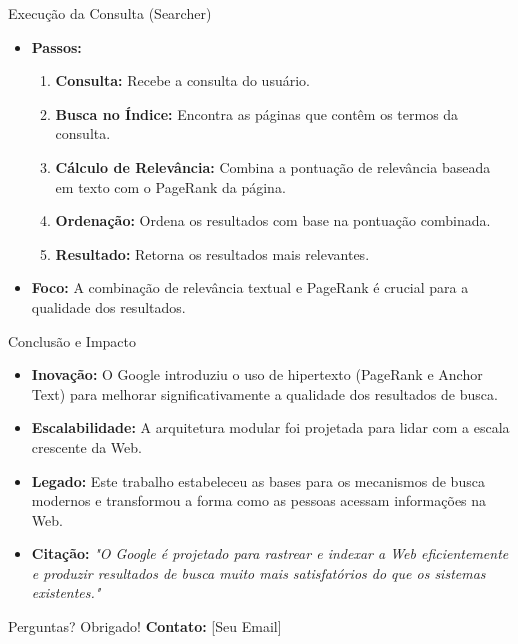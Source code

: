 \documentclass{beamer}
\begin{document}
\begin{frame}{Execução da Consulta (Searcher)}
    \begin{itemize}
        \item \textbf{Passos:}
        \begin{enumerate}
            \item \textbf{Consulta:} Recebe a consulta do usuário.
            \item \textbf{Busca no Índice:} Encontra as páginas que contêm os termos da consulta.
            \item \textbf{Cálculo de Relevância:} Combina a pontuação de relevância baseada em texto com o PageRank da página.
            \item \textbf{Ordenação:} Ordena os resultados com base na pontuação combinada.
            \item \textbf{Resultado:} Retorna os resultados mais relevantes.
        \end{enumerate}
        \item \textbf{Foco:} A combinação de relevância textual e PageRank é crucial para a qualidade dos resultados.
    \end{itemize}
\end{frame}

\begin{frame}{Conclusão e Impacto}
    \begin{itemize}
        \item \textbf{Inovação:} O Google introduziu o uso de hipertexto (PageRank e Anchor Text) para melhorar significativamente a qualidade dos resultados de busca.
        \item \textbf{Escalabilidade:} A arquitetura modular foi projetada para lidar com a escala crescente da Web.
        \item \textbf{Legado:} Este trabalho estabeleceu as bases para os mecanismos de busca modernos e transformou a forma como as pessoas acessam informações na Web.
        \item \textbf{Citação:} \textit{"O Google é projetado para rastrear e indexar a Web eficientemente e produzir resultados de busca muito mais satisfatórios do que os sistemas existentes."}
    \end{itemize}
\end{frame}

\begin{frame}{Perguntas?}
    \centering
    \Huge Obrigado!
    \vspace{1cm}
    \normalsize
    \textbf{Contato:} [Seu Email]
\end{frame}
\end{document}
